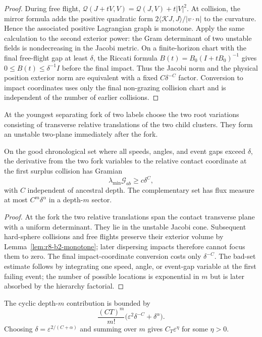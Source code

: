 \begin{proof}
During free flight,
$\mathcal Q(J+tV,V)=\mathcal Q(J,V)+t|V|^2$.  At collision, the mirror formula
adds the positive quadratic form
$2\langle\mathcal KJ,J\rangle/|v\cdot n|$ to the curvature.  Hence the
associated positive Lagrangian graph is monotone.  Apply the same calculation
to the second exterior power: the Gram determinant of two unstable fields is
nondecreasing in the Jacobi metric.  On a finite-horizon chart with the final
free-flight gap at least $\delta$, the Riccati formula
$B(t)=B_0(I+tB_0)^{-1}$ gives
$0\le B(t)\le\delta^{-1}I$ before the final impact.  Thus the Jacobi norm and
the physical position exterior norm are equivalent with a fixed
$C\delta^{-C}$ factor.  Conversion to impact coordinates uses only the final
non-grazing collision chart and is independent of the number of earlier
collisions.
\end{proof}

At the youngest separating fork of two labels choose the two root variations
consisting of transverse relative translations of the two child clusters.
They form an unstable two-plane immediately after the fork.

\begin{theorem}
\label{thm:r8-b2-gramian}
On the good chronological set where all speeds, angles, and event gaps exceed
$\delta$, the derivative from the two fork variables to the relative contact
coordinate at the first surplus collision has Gramian
\[
 \lambda_{\min}\mathcal G_{ab}\ge c\delta^C,
\]
with $C$ independent of ancestral depth.  The complementary set has flux
measure at most $C^m\delta^\alpha$ in a depth-$m$ sector.
\end{theorem}

\begin{proof}
At the fork the two relative translations span the contact transverse plane
with a uniform determinant.  They lie in the unstable Jacobi cone.  Subsequent
hard-sphere collisions and free flights preserve their exterior volume by
Lemma~\ref{lem:r8-b2-monotone}; later dispersing impacts therefore cannot focus
them to zero.  The final impact-coordinate conversion costs only
$\delta^{-C}$.  The bad-set estimate follows by integrating one speed, angle,
or event-gap variable at the first failing event; the number of possible
locations is exponential in $m$ but is later absorbed by the hierarchy
factorial.
\end{proof}

\begin{corollary}
\label{cor:r8-b2-recollision}
The cyclic depth-$m$ contribution is bounded by
\[
 \frac{(CT)^m}{m!}\bigl(\varepsilon^2\delta^{-C}+\delta^\alpha\bigr).
\]
Choosing $\delta=\varepsilon^{2/(C+\alpha)}$ and summing over $m$ gives
$C_T\varepsilon^{\eta}$ for some $\eta>0$.
\end{corollary}

